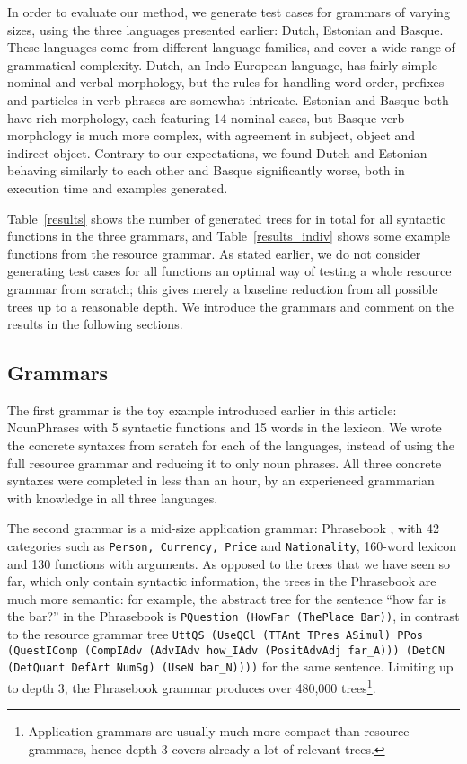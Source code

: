 \documentclass[11pt]{article}
\def\t#1{\texttt{#1}}
\begin{document}
In order to evaluate our method, we generate test cases for grammars
of varying sizes, using the three languages presented earlier: Dutch,
Estonian and Basque. These languages come from different language
families, and cover a wide range of grammatical complexity. Dutch, an
Indo-European language, has fairly simple nominal and verbal
morphology, but the rules for handling word order, prefixes and
particles in verb phrases are somewhat intricate. Estonian and Basque
both have rich morphology, each featuring 14 nominal cases, but Basque
verb morphology is much more complex, with agreement in subject,
object and indirect object. Contrary to our expectations, we found
Dutch and Estonian behaving similarly to each other and Basque
significantly worse, both in execution time and examples generated.

Table~\ref{results} shows the number of generated trees for 
in total for all syntactic functions in the three grammars, and
Table~\ref{results_indiv} shows some example functions from the resource grammar. 
As stated earlier, we do not consider generating test cases for all
functions an optimal way of testing a whole resource grammar from scratch;
this gives merely a baseline reduction from all possible trees up to a
reasonable depth. We introduce the grammars and comment on the results
in the following sections. 

\subsection{Grammars}

The first grammar is the toy example introduced earlier in this
article: NounPhrases with 5 syntactic functions and 15 words in the
lexicon. We wrote the concrete syntaxes from scratch for each of the
languages, instead of using the full resource grammar and reducing it
to only noun phrases. All three concrete syntaxes were completed
in less than an hour, by an experienced grammarian with knowledge in
all three languages.

The second grammar is a mid-size application grammar: Phrasebook
\cite{ranta2010phrasebook}, with 42 categories such as \t{Person,
  Currency, Price} and \t{Nationality}, 160-word lexicon and 130
functions with arguments. As opposed to the trees that we have seen so far,
which only contain syntactic information, the trees in the Phrasebook
are much more semantic: for example, the abstract tree for the
sentence ``how far is the bar?'' in the Phrasebook is \t{PQuestion
  (HowFar (ThePlace Bar))}, in contrast to the resource grammar tree
{\tt \small UttQS (UseQCl (TTAnt TPres ASimul) PPos (QuestIComp
  (CompIAdv (AdvIAdv how\_IAdv (PositAdvAdj far\_A))) 
  (DetCN (DetQuant DefArt NumSg) (UseN bar\_N))))} for the same
sentence. Limiting up to depth 3, the Phrasebook grammar produces over
480,000 trees\footnote{Application grammars are usually
much more compact than resource grammars, hence depth 3 covers already
a lot of relevant trees.}.
\end{document}
